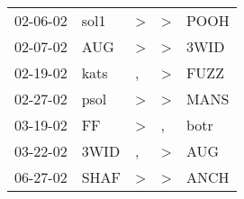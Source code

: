 \begin{supertabular}{lllll}
 02-06-02 &  sol1 &  \textgreater &  \textgreater &  POOH \\
 02-07-02 &   AUG &  \textgreater &  \textgreater &  3WID \\
 02-19-02 &  kats &             , &  \textgreater &  FUZZ \\
 02-27-02 &  psol &  \textgreater &  \textgreater &  MANS \\
 03-19-02 &    FF &  \textgreater &             , &  botr \\
 03-22-02 &  3WID &             , &  \textgreater &   AUG \\
 06-27-02 &  SHAF &  \textgreater &  \textgreater &  ANCH \\
\end{supertabular}
